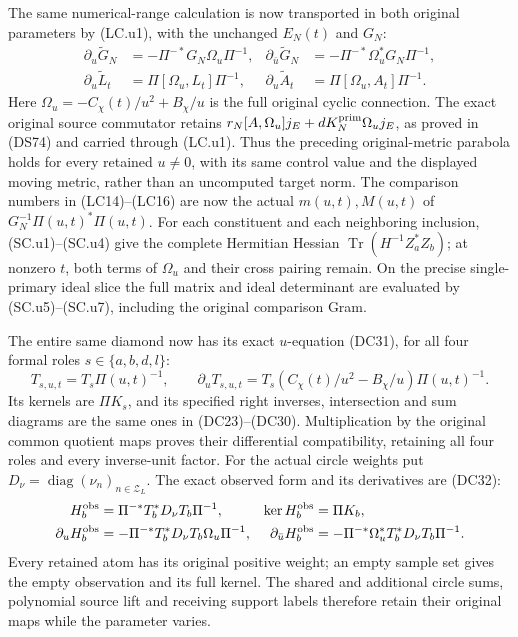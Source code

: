 The same numerical-range calculation is now transported in
both original parameters by (LC.u1), with the unchanged
\(E_N(t)\) and \(G_N\):
\[
 \begin{aligned}
 \partial_u\widetilde G_N
   &=-\Pi^{-*}G_N\Omega_u\Pi^{-1},&
 \partial_{\bar u}\widetilde G_N
   &=-\Pi^{-*}\Omega_u^*G_N\Pi^{-1},\\
 \partial_u\widetilde L_t
   &=\Pi[\Omega_u,L_t]\Pi^{-1},&
 \partial_u\widetilde A_t
   &=\Pi[\Omega_u,A_t]\Pi^{-1}.
 \end{aligned}
\]
Here \(\Omega_u=-C_\chi(t)/u^2+B_\chi/u\) is the full
original cyclic connection.  The exact original source
commutator retains
\(r_N[A,\Omega_u]j_E+dK_N^{\rm prim}\Omega_u j_E\),
as proved in (DS74) and carried through (LC.u1).
Thus the preceding original-metric parabola holds for every
retained \(u\ne0\), with its same control value and the
displayed moving metric, rather than an uncomputed target
norm.
The comparison numbers in (LC14)--(LC16) are now the actual
\(m(u,t),M(u,t)\) of \(G_N^{-1}\Pi(u,t)^*\Pi(u,t)\).
For each constituent and each neighboring inclusion,
(SC.u1)--(SC.u4) give the complete Hermitian Hessian
\(\operatorname{Tr}(H^{-1}Z_a^*Z_b)\);
at nonzero \(t\), both terms of \(\Omega_u\) and their
cross pairing remain.  On the precise single-primary ideal
slice the full matrix and ideal determinant are evaluated
by (SC.u5)--(SC.u7), including the original comparison Gram.

The entire same diamond now has its exact \(u\)-equation
(DC31), for all four formal roles \(s\in\{a,b,d,l\}\):
\[
 T_{s,u,t}=T_s\Pi(u,t)^{-1},\qquad
 \partial_uT_{s,u,t}
   =T_s(C_\chi(t)/u^2-B_\chi/u)\Pi(u,t)^{-1}.
\]
Its kernels are \(\Pi K_s\), and its specified right
inverses, intersection and sum diagrams are the same ones
in (DC23)--(DC30).  Multiplication by the original common
quotient maps proves their differential compatibility,
retaining all four roles and every inverse-unit factor.
For the actual circle weights put
\(D_\nu=\operatorname{diag}(\nu_n)_{n\in\mathcal Z_L}\).
The exact observed form and its derivatives are (DC32):
\[
 \begin{aligned}
 H_b^{\rm obs}&=\Pi^{-*}T_b^*D_\nu T_b\Pi^{-1},
 &\ker H_b^{\rm obs}&=\Pi K_b,\\
 \partial_uH_b^{\rm obs}
   &=-\Pi^{-*}T_b^*D_\nu T_b\Omega_u\Pi^{-1},&
 \partial_{\bar u}H_b^{\rm obs}
   &=-\Pi^{-*}\Omega_u^*T_b^*D_\nu T_b\Pi^{-1}.
 \end{aligned}
\]
Every retained atom has its original positive weight; an
empty sample set gives the empty observation and its full
kernel.  The shared and additional circle sums, polynomial
source lift and receiving support labels therefore retain
their original maps while the parameter varies.

